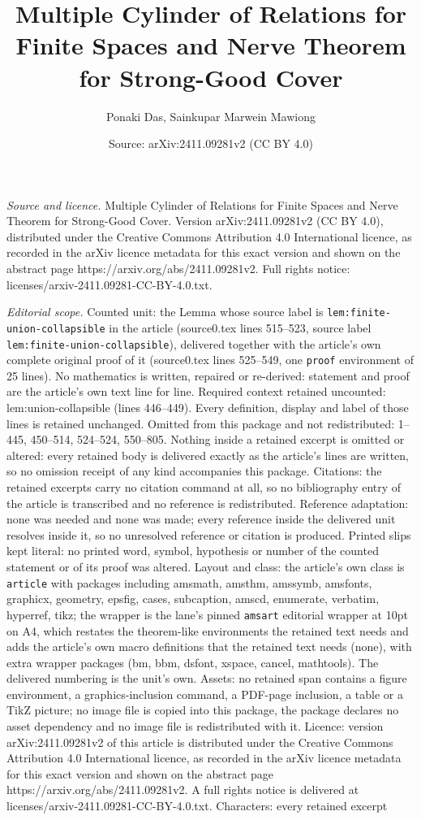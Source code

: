 \documentclass[10pt,a4paper]{amsart}
\title[Multiple Cylinder of Relations for Finite Spaces and Nerve T]{Multiple Cylinder of Relations for Finite Spaces and Nerve Theorem for Strong-Good Cover}
\author{Ponaki Das, Sainkupar Marwein Mawiong}
\date{Source: arXiv:2411.09281v2 (CC BY 4.0)}
\begin{document}
\maketitle

\noindent\emph{Source and licence.} Multiple Cylinder of Relations for Finite Spaces and Nerve Theorem for Strong-Good Cover. Version arXiv:2411.09281v2 (CC BY 4.0), distributed under the Creative Commons Attribution 4.0 International licence, as recorded in the arXiv licence metadata for this exact version and shown on the abstract page https://arxiv.org/abs/2411.09281v2. Full rights notice: licenses/arxiv-2411.09281-CC-BY-4.0.txt.\par\smallskip

\noindent\textit{Editorial scope.} Counted unit: the Lemma whose source label is \texttt{lem:finite-union-collapsible} in the article (source0.tex lines 515--523, source label \texttt{lem:finite-union-collapsible}), delivered together with the article's own complete original proof of it (source0.tex lines 525--549, one \texttt{proof} environment of 25 lines). No mathematics is written, repaired or re-derived: statement and proof are the article's own text line for line. Required context retained uncounted: lem:union-collapsible (lines 446--449). Every definition, display and label of those lines is retained unchanged. Omitted from this package and not redistributed: 1--445, 450--514, 524--524, 550--805. Nothing inside a retained excerpt is omitted or altered: every retained body is delivered exactly as the article's lines are written, so no omission receipt of any kind accompanies this package. Citations: the retained excerpts carry no citation command at all, so no bibliography entry of the article is transcribed and no reference is redistributed. Reference adaptation: none was needed and none was made; every reference inside the delivered unit resolves inside it, so no unresolved reference or citation is produced. Printed slips kept literal: no printed word, symbol, hypothesis or number of the counted statement or of its proof was altered. Layout and class: the article's own class is \texttt{article} with packages including amsmath, amsthm, amssymb, amsfonts, graphicx, geometry, epsfig, cases, subcaption, amscd, enumerate, verbatim, hyperref, tikz; the wrapper is the lane's pinned \texttt{amsart} editorial wrapper at 10pt on A4, which restates the theorem-like environments the retained text needs and adds the article's own macro definitions that the retained text needs (none), with extra wrapper packages (bm, bbm, dsfont, xspace, cancel, mathtools). The delivered numbering is the unit's own. Assets: no retained span contains a figure environment, a graphics-inclusion command, a PDF-page inclusion, a table or a TikZ picture; no image file is copied into this package, the package declares no asset dependency and no image file is redistributed with it. Licence: version arXiv:2411.09281v2 of this article is distributed under the Creative Commons Attribution 4.0 International licence, as recorded in the arXiv licence metadata for this exact version and shown on the abstract page https://arxiv.org/abs/2411.09281v2. A full rights notice is delivered at licenses/arxiv-2411.09281-CC-BY-4.0.txt. Characters: every retained excerpt 
\end{document}
